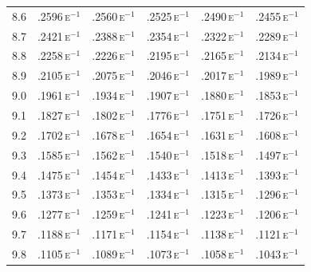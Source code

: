 \begin{minipage}[t]{95mm}
{\begin{tabular}{cccccc}
        8.6            & .2596\,\textsc{e}$^{-1}$ & .2560\,\textsc{e}$^{-1}$ & .2525\,\textsc{e}$^{-1}$ & .2490\,\textsc{e}$^{-1}$ & .2455\,\textsc{e}$^{-1}$ \\
        8.7            & .2421\,\textsc{e}$^{-1}$ & .2388\,\textsc{e}$^{-1}$ & .2354\,\textsc{e}$^{-1}$ & .2322\,\textsc{e}$^{-1}$ & .2289\,\textsc{e}$^{-1}$ \\
        8.8            & .2258\,\textsc{e}$^{-1}$ & .2226\,\textsc{e}$^{-1}$ & .2195\,\textsc{e}$^{-1}$ & .2165\,\textsc{e}$^{-1}$ & .2134\,\textsc{e}$^{-1}$ \\
        8.9            & .2105\,\textsc{e}$^{-1}$ & .2075\,\textsc{e}$^{-1}$ & .2046\,\textsc{e}$^{-1}$ & .2017\,\textsc{e}$^{-1}$ & .1989\,\textsc{e}$^{-1}$ \\[1.5ex]
        9.0            & .1961\,\textsc{e}$^{-1}$ & .1934\,\textsc{e}$^{-1}$ & .1907\,\textsc{e}$^{-1}$ & .1880\,\textsc{e}$^{-1}$ & .1853\,\textsc{e}$^{-1}$ \\
        9.1            & .1827\,\textsc{e}$^{-1}$ & .1802\,\textsc{e}$^{-1}$ & .1776\,\textsc{e}$^{-1}$ & .1751\,\textsc{e}$^{-1}$ & .1726\,\textsc{e}$^{-1}$ \\
        9.2            & .1702\,\textsc{e}$^{-1}$ & .1678\,\textsc{e}$^{-1}$ & .1654\,\textsc{e}$^{-1}$ & .1631\,\textsc{e}$^{-1}$ & .1608\,\textsc{e}$^{-1}$ \\
        9.3            & .1585\,\textsc{e}$^{-1}$ & .1562\,\textsc{e}$^{-1}$ & .1540\,\textsc{e}$^{-1}$ & .1518\,\textsc{e}$^{-1}$ & .1497\,\textsc{e}$^{-1}$ \\
        9.4            & .1475\,\textsc{e}$^{-1}$ & .1454\,\textsc{e}$^{-1}$ & .1433\,\textsc{e}$^{-1}$ & .1413\,\textsc{e}$^{-1}$ & .1393\,\textsc{e}$^{-1}$ \\
        9.5            & .1373\,\textsc{e}$^{-1}$ & .1353\,\textsc{e}$^{-1}$ & .1334\,\textsc{e}$^{-1}$ & .1315\,\textsc{e}$^{-1}$ & .1296\,\textsc{e}$^{-1}$ \\
        9.6            & .1277\,\textsc{e}$^{-1}$ & .1259\,\textsc{e}$^{-1}$ & .1241\,\textsc{e}$^{-1}$ & .1223\,\textsc{e}$^{-1}$ & .1206\,\textsc{e}$^{-1}$ \\
        9.7            & .1188\,\textsc{e}$^{-1}$ & .1171\,\textsc{e}$^{-1}$ & .1154\,\textsc{e}$^{-1}$ & .1138\,\textsc{e}$^{-1}$ & .1121\,\textsc{e}$^{-1}$ \\
        9.8            & .1105\,\textsc{e}$^{-1}$ & .1089\,\textsc{e}$^{-1}$ & .1073\,\textsc{e}$^{-1}$ & .1058\,\textsc{e}$^{-1}$ & .1043\,\textsc{e}$^{-1}$ \\

\end{tabular}}
\end{minipage}
